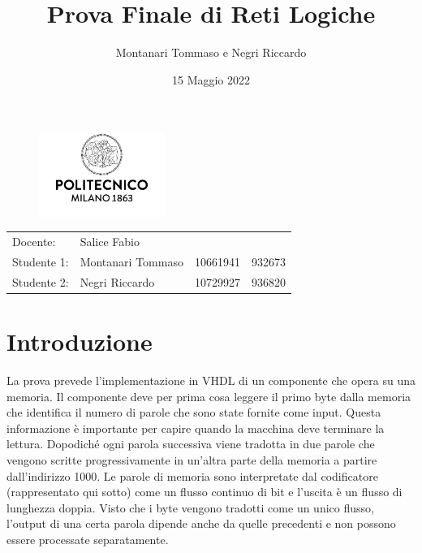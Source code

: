 \documentclass{article}
\title{Prova Finale di Reti Logiche} %
\author{Montanari Tommaso e Negri Riccardo} %
\date{15 Maggio 2022}
\begin{document}
\maketitle %
\begin{figure}[H]
	\centering
	\includegraphics[width=0.365\textwidth]{Assets/logo.jpg}
\end{figure}
\begin{center}

\begin{tabular}{l l l l}
Docente: & Salice Fabio & & \\ 
Studente 1: & Montanari Tommaso & 10661941 & 932673\\
Studente 2: & Negri Riccardo & 10729927 & 936820 
\end{tabular}
\end{center}

\tableofcontents
\pagebreak


\section{Introduzione}

La prova prevede l'implementazione in VHDL di un componente che opera su una memoria. Il componente deve per prima cosa leggere il primo byte dalla memoria che identifica il numero di parole che sono
state fornite come input. Questa informazione è importante per capire quando la macchina deve terminare la lettura. Dopodiché ogni parola successiva viene tradotta in due parole che vengono scritte progressivamente in un'altra parte della memoria a partire dall'indirizzo 1000. Le parole di memoria sono interpretate dal codificatore (rappresentato qui sotto) come un flusso continuo di bit e l'uscita è un flusso di lunghezza doppia. Visto che i byte vengono tradotti come un unico flusso, l'output di una certa parola dipende anche da quelle precedenti e non possono essere processate separatamente.
\end{document}
